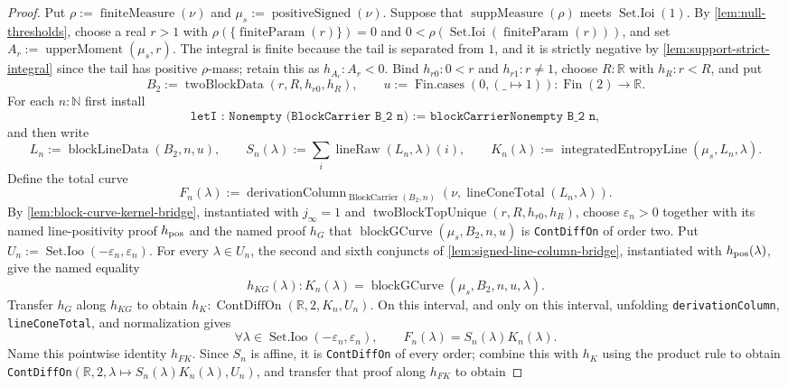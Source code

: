\documentclass[9pt]{extarticle}
\theoremstyle{definition}
\theoremstyle{remark}
\newcommand{\R}{\mathbb R}
\newcommand{\N}{\mathbb N}
\newcommand{\eps}{\varepsilon}
\begin{document}
\begin{proof}
Put $\rho:=\operatorname{finiteMeasure}(\nu)$ and
$\mu_s:=\operatorname{positiveSigned}(\nu)$. Suppose that
$\operatorname{suppMeasure}(\rho)$ meets $\operatorname{Set.Ioi}(1)$. By
\cref{lem:null-thresholds}, choose a real $r>1$ with
$\rho(\{\operatorname{finiteParam}(r)\})=0$ and
$0<\rho(\operatorname{Set.Ioi}(\operatorname{finiteParam}(r)))$, and set
$A_r:=\operatorname{upperMoment}(\mu_s,r)$.
The integral is finite because the tail is separated from $1$, and it is
strictly negative by \cref{lem:support-strict-integral} since the tail has
positive $\rho$-mass; retain this as $h_{A_r}:A_r<0$.  Bind $h_{r0}:0<r$
and $h_{r1}:r\neq1$, choose
$R:\R$ with $h_R:r<R$, and put
\[
 B_2:=\operatorname{twoBlockData}(r,R,h_{r0},h_R),\qquad
 u:=\operatorname{Fin.cases}(0,(\_\mapsto1)):
   \operatorname{Fin}(2)\to\R.
\]
For each $n:\N$ first install
\[
 \texttt{letI : Nonempty (BlockCarrier B\_2 n) :=
   blockCarrierNonempty B\_2 n},
\]
and then write
\[
 L_n:=\operatorname{blockLineData}(B_2,n,u),\qquad
 S_n(\lambda):=\sum_i\operatorname{lineRaw}(L_n,\lambda)(i),
 \qquad
 K_n(\lambda):=\operatorname{integratedEntropyLine}(\mu_s,L_n,\lambda).
\]
Define the total curve
\[
 F_n(\lambda):=
 \operatorname{derivationColumn}_{\operatorname{BlockCarrier}(B_2,n)}
  (\nu,\operatorname{lineConeTotal}(L_n,\lambda)).
\]
By \cref{lem:block-curve-kernel-bridge}, instantiated with
$j_\infty=1$ and
$\operatorname{twoBlockTopUnique}(r,R,h_{r0},h_R)$, choose
$\eps_n>0$ together with its named line-positivity proof $h_{\rm pos}$ and
the named proof $h_G$ that
$\operatorname{blockGCurve}(\mu_s,B_2,n,u)$ is \texttt{ContDiffOn} of order
two.  Put $U_n:=\operatorname{Set.Ioo}(-\eps_n,\eps_n)$.  For every
$\lambda\in U_n$, the second and sixth conjuncts of
\cref{lem:signed-line-column-bridge}, instantiated with
$h_{\rm pos}(\lambda)$, give the named equality
\[
 h_{KG}(\lambda):K_n(\lambda)
  =\operatorname{blockGCurve}(\mu_s,B_2,n,u,\lambda).
\]
Transfer $h_G$ along $h_{KG}$ to obtain
$h_K:\operatorname{ContDiffOn}(\R,2,K_n,U_n)$.
On this interval, and only on this interval, unfolding
\texttt{derivationColumn}, \texttt{lineConeTotal}, and normalization gives
\[
 \forall\lambda\in\operatorname{Set.Ioo}(-\eps_n,\eps_n),\qquad
 F_n(\lambda)=S_n(\lambda)K_n(\lambda).
\]
Name this pointwise identity $h_{FK}$.  Since $S_n$ is affine, it is
\texttt{ContDiffOn} of every order; combine this with $h_K$ using the
product rule to obtain
\texttt{ContDiffOn}$(\R,2,\lambda\mapsto S_n(\lambda)K_n(\lambda),U_n)$,
and transfer that proof along $h_{FK}$ to obtain

\end{proof}
\end{document}
